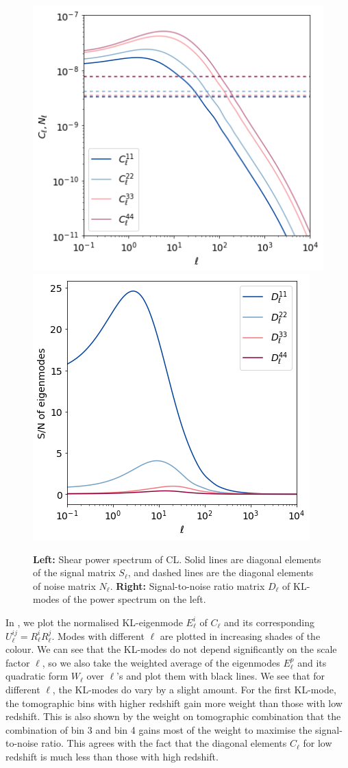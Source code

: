 \documentclass[twocolumn]{\docclass}
\begin{document}
	\begin{figure}
		\includegraphics[width=0.7\columnwidth]{Cl_pst.png}
		\qquad \qquad \qquad
		\includegraphics[width=0.7\columnwidth]{Dl_pst.png}
		\caption{\textbf{Left:} Shear power spectrum of CL. Solid lines are diagonal elements of the signal matrix $S_{\ell}$, and dashed lines are the diagonal elements of noise matrix $N_{\ell}$.
			\textbf{Right:} Signal-to-noise ratio matrix $D_\ell$ of KL-modes of the power spectrum on the left.  \label{fig:ClDl}}
	\end{figure}
	
	In , we plot the normalised KL-eigenmode $E_\ell^i$ of $C_{\ell}$ and its corresponding $U^{ij}_\ell=R_\ell^i R_\ell^j$. Modes with different $\ell$ are plotted in increasing shades of the colour. We can see that the KL-modes do not depend significantly on the scale factor $\ell$, so we also take the weighted average of the eigenmodes $E_\ell^p$ and its quadratic form $W_\ell$ over $\ell$'s and plot them with black lines. 	We see that for different $\ell$, the KL-modes do vary by a slight amount. For the first KL-mode, the tomographic bins with higher redshift gain more weight than those with low redshift. This is also shown by the weight on tomographic combination that the combination of bin 3 and bin 4 gains most of the weight to maximise the signal-to-noise ratio. This agrees with the fact that the diagonal elements $C_\ell$ for low redshift is much less than those with high redshift.
	
\end{document}
